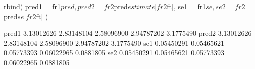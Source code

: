 \begin{Schunk}
\begin{Sinput}
 rbind(
   pred1 = fr1$pred, pred2 = fr2$pred$estimate[fr2$ft],
   se1 = fr1$se, se2 = fr2$pred$se[fr2$ft]
 )
\end{Sinput}
\begin{Soutput}
            [,1]       [,2]       [,3]       [,4]      [,5]
pred1 3.13012626 2.83148104 2.58096900 2.94787202 3.1775490
pred2 3.13012626 2.83148104 2.58096900 2.94787202 3.1775490
se1   0.05450291 0.05465621 0.05773393 0.06022965 0.0881805
se2   0.05450291 0.05465621 0.05773393 0.06022965 0.0881805
\end{Soutput}
\end{Schunk}
